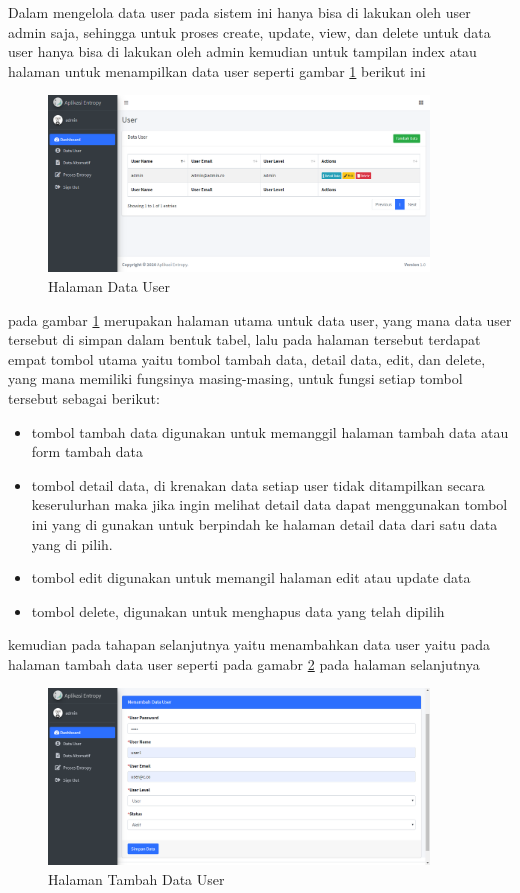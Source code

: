 	Dalam mengelola data user pada sistem ini hanya bisa di lakukan oleh user admin saja, sehingga untuk proses create, update, view, dan delete untuk data user hanya bisa di lakukan oleh admin kemudian untuk tampilan index atau halaman untuk menampilkan data user seperti gambar \ref{us1} berikut ini
\begin{figure}[!htbp]
	\centerline{\includegraphics[width=0.90\textwidth]{figures/us1/1.png}}
	\caption{Halaman Data User}
	\label{us1}
\end{figure}
pada gambar \ref{us1} merupakan halaman utama untuk data user, yang mana data user tersebut di simpan dalam bentuk tabel, lalu pada halaman tersebut terdapat empat tombol utama yaitu tombol tambah data, detail data, edit, dan delete, yang mana memiliki fungsinya masing-masing, untuk fungsi setiap tombol tersebut sebagai berikut:
\begin{itemize}
\item tombol tambah data digunakan untuk memanggil halaman tambah data atau form tambah data
\item tombol detail data, di krenakan data setiap user tidak ditampilkan secara keserulurhan maka jika ingin melihat detail data dapat menggunakan tombol ini yang di gunakan untuk berpindah ke halaman detail data dari satu data yang di pilih.
\item tombol edit digunakan untuk memangil halaman edit atau update data 
\item tombol delete, digunakan untuk menghapus data yang telah dipilih
\end{itemize}

kemudian pada tahapan selanjutnya yaitu menambahkan data user yaitu pada halaman tambah data user seperti pada gamabr \ref {us2} pada halaman selanjutnya
\pagebreak
\begin{figure}[!htbp]
	\centerline{\includegraphics[width=0.90\textwidth]{figures/us1/2.png}}
	\caption{Halaman Tambah Data User}
	\label{us2}
\end{figure}

